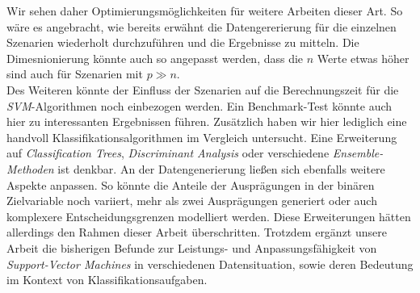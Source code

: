\documentclass[
]{article}
\begin{document}
Wir sehen daher Optimierungsmöglichkeiten für weitere Arbeiten dieser
Art. So wäre es angebracht, wie bereits erwähnt die Datengererierung für
die einzelnen Szenarien wiederholt durchzuführen und die Ergebnisse zu
mitteln. Die Dimesnionierung könnte auch so angepasst werden, dass die
\(n\) Werte etwas höher sind auch für Szenarien mit \(p \gg n\).\\
Des Weiteren könnte der Einfluss der Szenarien auf die Berechnungszeit
für die \textit{SVM}-Algorithmen noch einbezogen werden. Ein
Benchmark-Test könnte auch hier zu interessanten Ergebnissen führen.
Zusätzlich haben wir hier lediglich eine handvoll
Klassifikationsalgorithmen im Vergleich untersucht. Eine Erweiterung auf
\textit{Classification Trees}, \textit{Discriminant Analysis} oder
verschiedene \textit{Ensemble-Methoden} ist denkbar. An der
Datengenerierung ließen sich ebenfalls weitere Aspekte anpassen. So
könnte die Anteile der Ausprägungen in der binären Zielvariable noch
variiert, mehr als zwei Ausprägungen generiert oder auch komplexere
Entscheidungsgrenzen modelliert werden. Diese Erweiterungen hätten
allerdings den Rahmen dieser Arbeit überschritten. Trotzdem ergänzt
unsere Arbeit die bisherigen Befunde zur Leistungs- und
Anpassungsfähigkeit von \textit{Support-Vector Machines} in
verschiedenen Datensituation, sowie deren Bedeutung im Kontext von
Klassifikationsaufgaben.

\printbibliography
\end{document}
